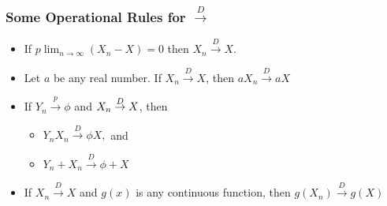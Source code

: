 \documentclass[notes=show,smaller,handout]{beamer}\usepackage[]{graphicx}\usepackage[]{color}
\newenvironment{stepitemize}{\begin{itemize}[<+->]}{\end{itemize} }
\begin{document}
\begin{frame}%

\frametitle{Some Operational Rules for $\overset{D}{\rightarrow }$}

\begin{stepitemize}

\item If $p\lim_{n\rightarrow\infty}(X_n-X)=0$ then $X_{n}\overset{D}{\rightarrow }X$. \vspace{0.3cm}
\item Let $a$ be any real number. If $X_{n}\overset{D}{\rightarrow }X$, then
$aX_{n}\overset{D}{\rightarrow }aX$ \vspace{0.6cm}

\item If $Y_{n}\overset{p}{\rightarrow }\phi $ and $X_{n}\overset{D}{%
\rightarrow }X$, then \vspace{0.3cm}

\begin{stepitemize}
\item $Y_{n}X_{n}\overset{D}{\rightarrow }\phi X,$ and \vspace{0.3cm}

\item $Y_{n}+X_{n}\overset{D}{\rightarrow }\phi +X$
\end{stepitemize} \vspace{0.6cm}

\item If $X_{n}\overset{D}{\rightarrow }X$ and $g\left( x\right) $ is any
continuous function, then $g\left( X_{n}\right) \overset{D}{\rightarrow }%
g\left( X\right) $ \vspace{0.6cm}


%
\end{stepitemize}

\end{frame}
\end{document}
